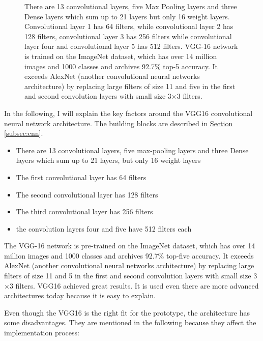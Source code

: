 \begin{figure}[htp]
	\centering
	\caption{
		There are 13 convolutional layers, five Max Pooling layers and three Dense layers which sum up to 21 layers but only 16 weight layers. Convolutional layer 1 has 64 filters, while convolutional layer 2 has 128 filters, convolutional layer 3 has 256 filters while convolutional layer four and convolutional layer 5 has 512 filters. VGG-16 network is trained on the ImageNet dataset, which has over 14 million images and 1000 classes and archives 92.7\% top-5 accuracy. It exceeds AlexNet (another convolutional neural networks architecture) by replacing large filters of size 11 and five in the first and second convolution layers with small size 3\(\times\)3 filters.
	}
	\label{fig:36_architecture_from_vgg16_net}
\end{figure}

In the following, I will explain the key factors around the VGG16 convolutional neural network architecture. The building blocks are described in \hyperref[subsec:cnn]{Section \ref{subsec:cnn}}. 

\begin{itemize}
	\item There are 13 convolutional layers, five max-pooling layers and three Dense layers which sum up to 21 layers, but only 16 weight layers
	\item The first convolutional layer has 64 filters
	\item The second convolutional layer has 128 filters
	\item The third convolutional layer has 256 filters 
	\item the convolution layers four and five have 512 filters each 
\end{itemize}

The VGG-16 network is pre-trained on the ImageNet dataset, which has over 14 million images and 1000 classes and archives 92.7\% top-five accuracy. It exceeds AlexNet (another convolutional neural networks architecture) by replacing large filters of size 11 and 5 in the first and second convolution layers with small size 3\(\times\)3 filters. VGG16 achieved great results. It is used even there are more advanced architectures today because it is easy to explain. 

Even though the VGG16 is the right fit for the prototype, the architecture has some disadvantages. They are mentioned in the following because they affect the implementation process: 

